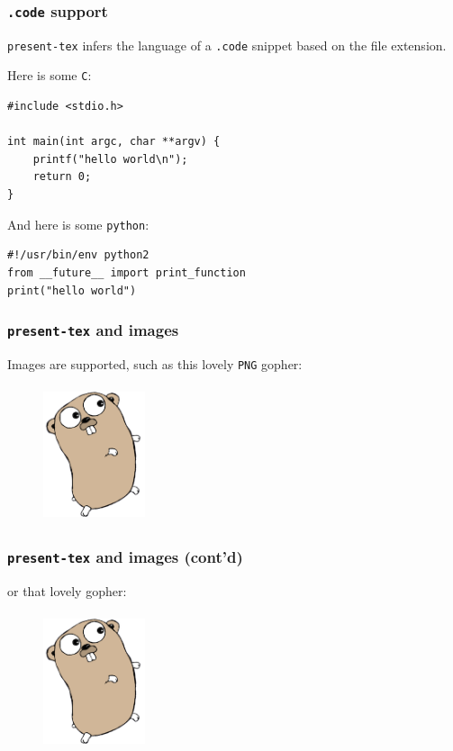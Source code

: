 \documentclass[9pt]{beamer}
\begin{document}
\begin{frame}[fragile]
\frametitle{\texttt{.code} support}


\texttt{present-tex} infers the language of a \texttt{.code} snippet based on the file extension.


Here is some \texttt{C}:


\begin{verbatim}
#include <stdio.h>

int main(int argc, char **argv) {
	printf("hello world\n");
	return 0;
}

\end{verbatim}

And here is some \texttt{python}:


\begin{verbatim}
#!/usr/bin/env python2
from __future__ import print_function
print("hello world")

\end{verbatim}


\end{frame}

\begin{frame}[fragile]
\frametitle{\texttt{present-tex} and images}


Images are supported, such as this lovely \texttt{PNG} gopher:


\begin{figure}[h]
\begin{center}
\includegraphics[width=3cm,height=4cm]{_figs/gopher.png}
\end{center}

\end{figure}


\end{frame}

\begin{frame}[fragile]
\frametitle{\texttt{present-tex} and images (cont'd)}


or that lovely gopher:


\begin{figure}[h]
\begin{center}
\includegraphics[width=3cm,height=4cm]{_figs/gopher.png}
\end{center}

\end{figure}


\end{frame}
\end{document}
